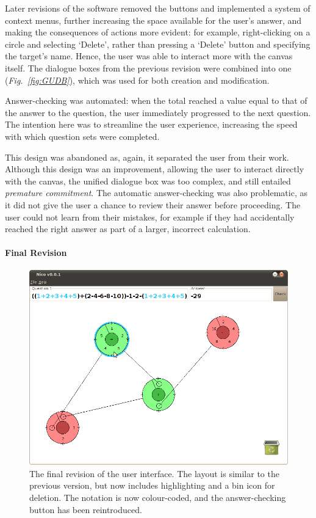 \documentclass[12pt,twoside,notitlepage,xetex]{report}
\begin{document}
Later revisions of the software removed the buttons and implemented a system of context menus, further increasing the space available for the user's answer, and making the consequences of actions more evident: for example, right-clicking on a circle and selecting `Delete', rather than pressing a `Delete' button and specifying the target's name.  Hence, the user was able to interact more with the canvas itself.  The dialogue boxes from the previous revision were combined into one (\emph{Fig.~\ref{fig:GUDB}}), which was used for both creation and modification.

Answer-checking was automated: when the total reached a value equal to that of the answer to the question, the user immediately progressed to the next question.  The intention here was to streamline the user experience, increasing the speed with which question sets were completed.

This design was abandoned as, again, it separated the user from their work.  Although this design was an improvement, allowing the user to interact directly with the canvas, the unified dialogue box was too complex, and still entailed \emph{premature commitment}.  The automatic answer-checking was also problematic, as it did not give the user a chance to review their answer before proceeding.  The user could not learn from their mistakes, for example if they had accidentally reached the right answer as part of a larger, incorrect calculation.

\paragraph{Final Revision}\hfill

\begin{center}
\begin{figure}[H]
\begin{center}
\includegraphics[width=\textwidth-4cm]{figs/nico_screen_new.png}
\end{center}
\caption{The final revision of the user interface.  The layout is similar to the previous version, but now includes highlighting and a bin icon for deletion.  The notation is now colour-coded, and the answer-checking button has been reintroduced.}
\label{fig:OldApps3}
\end{figure}
\end{center}
\end{document}
